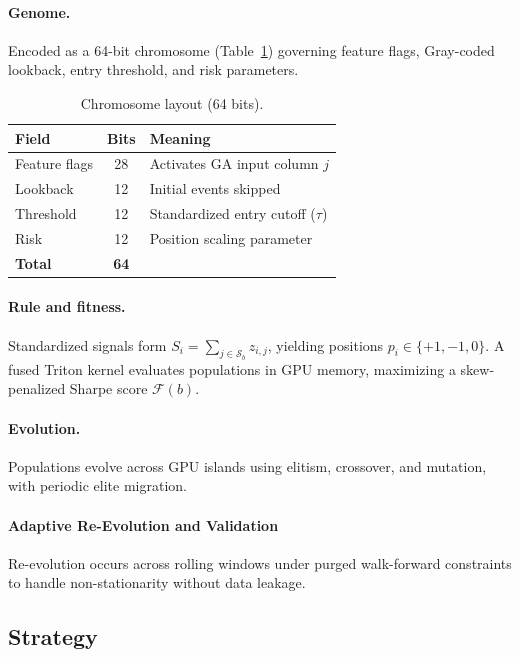 \documentclass[11pt,letterpaper]{article}
\begin{document}
\paragraph{Genome.} Encoded as a 64-bit chromosome (Table~\ref{tab:genome}) governing feature flags, Gray-coded lookback, entry threshold, and risk parameters.
 
\begin{table}[h]
\centering
\caption{Chromosome layout (64 bits).}
\label{tab:genome}
\small
\begin{tabular}{@{}lcl@{}}
\toprule
\textbf{Field} & \textbf{Bits} & \textbf{Meaning} \\
\midrule
Feature flags & 28 & Activates GA input column $j$ \\
Lookback & 12 & Initial events skipped \\
Threshold & 12 & Standardized entry cutoff ($\tau$) \\
Risk & 12 & Position scaling parameter \\
\midrule
\textbf{Total} & \textbf{64} & \\
\bottomrule
\end{tabular}
\end{table}
 
\paragraph{Rule and fitness.} Standardized signals form $S_i = \sum_{j\in\mathcal{S}_b} z_{i,j}$, yielding positions $p_i \in \{+1, -1, 0\}$. A fused Triton kernel evaluates populations in GPU memory, maximizing a skew-penalized Sharpe score $\mathcal{F}(b)$.
 
\paragraph{Evolution.} Populations evolve across GPU islands using elitism, crossover, and mutation, with periodic elite migration.
 
\paragraph{Adaptive Re-Evolution and Validation} Re-evolution occurs across rolling windows under purged walk-forward constraints to handle non-stationarity without data leakage.

\subsection{Strategy}
\end{document}
